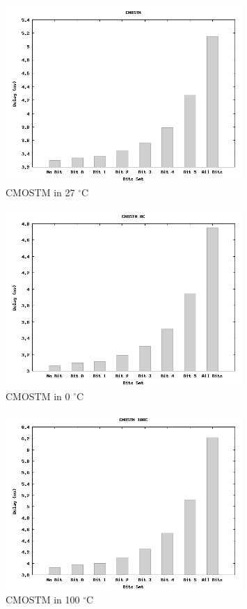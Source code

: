 \documentclass[a4paper,12pt]{article} \usepackage{graphicx}
\newcommand{\degree}{\ensuremath{^\circ}}
\begin{document}
\begin{figure}[h!]
        \centering
        \includegraphics[width=0.8\textwidth]{../Bilder/Delay_Line/CMOSTM.png}
        \caption{CMOSTM in 27 \degree C}
        \label{fig:CMOSTM}
\end{figure}

\begin{figure}[h!]
        \centering
        \includegraphics[width=0.8\textwidth]{../Bilder/Delay_Line/CMOSTM0.png}
        \caption{CMOSTM in 0 \degree C}
        \label{fig:CMOSTM0}
\end{figure}

\begin{figure}[h!]
        \centering
        \includegraphics[width=0.8\textwidth]{../Bilder/Delay_Line/CMOSTM100.png}
        \caption{CMOSTM in 100 \degree C}
        \label{fig:CMOSTM100}
\end{figure}
\end{document}
